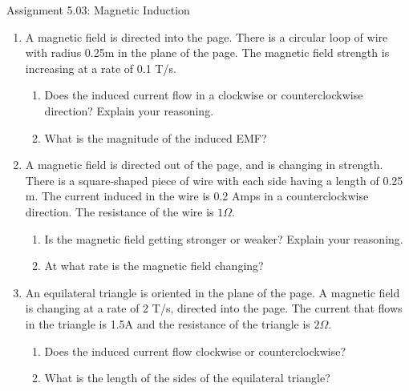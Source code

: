 \documentclass[letterpaper, 12pt]{article}
\begin{document}
	

	
\begin{center}Assignment 5.03: Magnetic Induction
\end{center}

\begin{enumerate}




	\item A magnetic field is directed into the page.  There is a circular loop of wire with radius 0.25m in the plane of the page.  The magnetic field strength is increasing at a rate of 0.1 T/s.
	
\begin{enumerate}
	\item Does the induced current flow in a clockwise or counterclockwise direction?  Explain your reasoning.  
	
	\vspace{.75in}
	\item What is the magnitude of the induced EMF? 
\end{enumerate}

	\vspace{.75in}
	
		\item A magnetic field is directed out of the page, and is changing in strength.  There is a square-shaped piece of wire with each side having a length of 0.25 m.  The current induced in the wire is 0.2 Amps in a counterclockwise direction.  The resistance of the wire is $1 \Omega$.
	\begin{enumerate}
		\item Is the magnetic field getting stronger or weaker? Explain your reasoning.
		\vspace{.75in}
		\item At what rate is the magnetic field changing?
	\end{enumerate}
	
	\vspace{.75in}
	
		\item An equilateral triangle is oriented in the plane of the page.  A magnetic field is changing at a rate of 2 T/s, directed into the page.  The current that flows in the triangle is 1.5A and the resistance of the triangle is $2\Omega$. 
		\begin{enumerate}
			\item Does the induced current flow clockwise or counterclockwise?
			\vspace{0.75in}
			\item What is the length of the sides of the equilateral triangle?
		\end{enumerate}
		



\end{enumerate}
\end{document}

